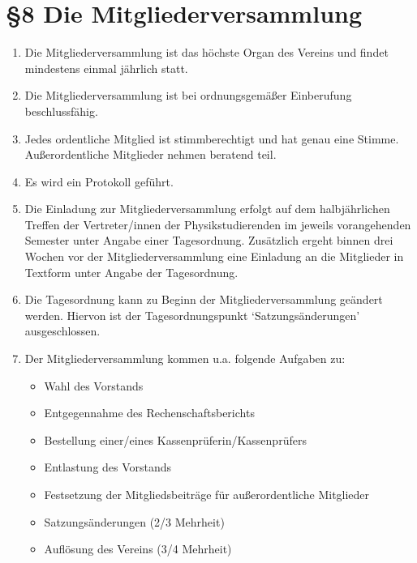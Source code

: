 \documentclass[ngerman]{article}
\begin{document}
\section*{§8 Die Mitgliederversammlung}
\begin{enumerate}
 \item Die Mitgliederversammlung ist das höchste Organ des Vereins und findet mindestens einmal jährlich statt.
 \item Die Mitgliederversammlung ist bei ordnungsgemäßer Einberufung beschlussfähig.
 \item Jedes ordentliche Mitglied ist stimmberechtigt und hat genau eine Stimme. Außerordentliche Mitglieder nehmen beratend teil.
 \item Es wird ein Protokoll geführt.
 \item Die Einladung zur Mitgliederversammlung erfolgt auf dem halbjährlichen Treffen der Vertreter/innen der Physikstudierenden im jeweils vorangehenden Semester unter Angabe einer Tagesordnung. Zusätzlich ergeht binnen drei Wochen vor der Mitgliederversammlung eine Einladung an die Mitglieder in Textform unter Angabe der Tagesordnung.
 \item Die Tagesordnung kann zu Beginn der Mitgliederversammlung geändert werden. Hiervon ist der Tagesordnungspunkt `Satzungsänderungen' ausgeschlossen.
 \item Der Mitgliederversammlung kommen u.a. folgende Aufgaben zu:
 \begin{itemize}
  \item Wahl des Vorstands
  \item Entgegennahme des Rechenschaftsberichts
  \item Bestellung einer/eines Kassenprüferin/Kassenprüfers
  \item Entlastung des Vorstands
  \item Festsetzung der Mitgliedsbeiträge für außerordentliche Mitglieder
  \item Satzungsänderungen (2/3 Mehrheit)
  \item Auflösung des Vereins (3/4 Mehrheit)
 \end{itemize}
\end{enumerate}
\end{document}
